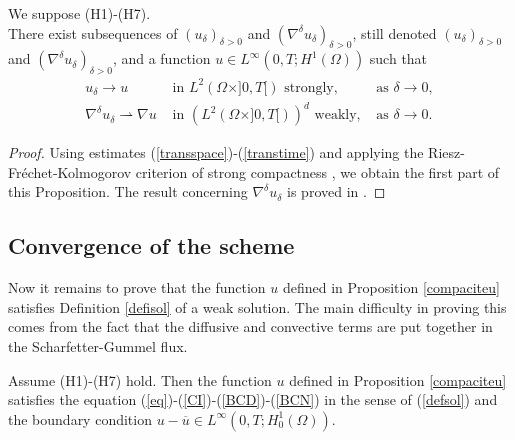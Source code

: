 \documentclass[smallextended]{svjour3}
\begin{document}
\begin{proposition}
We suppose (H1)-(H7). \\
There exist subsequences of $(u_{\delta})_{\delta>0}$ and $(\nabla^{\delta}u_{\delta})_{\delta>0}$, still denoted $(u_{\delta})_{\delta>0}$ and $(\nabla^{\delta}u_{\delta})_{\delta>0}$, and a function $u \in L^{\infty}(0,T;H^{1}(\Omega))$ such that
\begin{equation*}
\begin{array}{cll} u_{\delta} \rightarrow  u & \text{ in } L^{2}(\Omega \times ]0,T[) \text{ strongly,} & \text{ as } \delta \rightarrow 0, \\
\nabla^{\delta}u_{\delta} \rightharpoonup \nabla u & \text{ in } (L^{2}(\Omega \times ]0,T[))^{d} \text{ weakly,} & \text{ as } \delta \rightarrow 0. \end{array}
\end{equation*}
\label{compaciteu}
\end{proposition}

\begin{proof}
Using estimates (\ref{transspace})-(\ref{transtime}) and applying the Riesz-Fréchet-Kolmogorov criterion of strong compactness \cite{Brezis1983}, we obtain the first part of this Proposition. The result concerning $\nabla^{\delta}u_{\delta}$ is proved in \cite{Chainais-Hillairet2003}.
\end{proof}



\subsection{Convergence of the scheme} 

Now it remains to prove that the function $u$ defined in Proposition \ref{compaciteu} satisfies Definition \ref{defisol} of a weak solution. The main difficulty in proving this comes from the fact that the diffusive and convective terms are put together in the Scharfetter-Gummel flux.

\begin{theorem}
Assume (H1)-(H7) hold. Then the function $u$ defined in Proposition \ref{compaciteu} satisfies the equation (\ref{eq})-(\ref{CI})-(\ref{BCD})-(\ref{BCN}) in the sense of (\ref{defsol}) and the boundary condition $u-\overline{u} \in L^{\infty}(0,T;H^{1}_{0}(\Omega))$.
\end{theorem}
\end{document}
